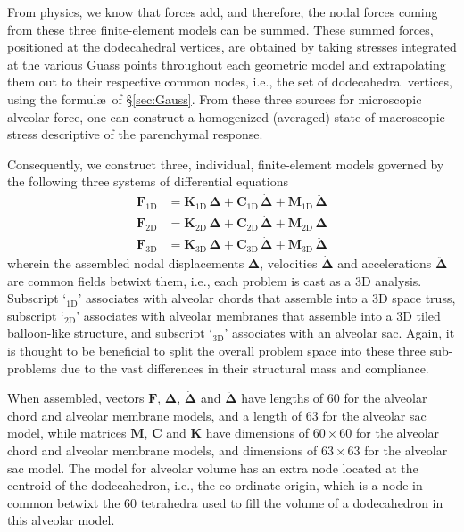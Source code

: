 From physics, we know that forces add, and therefore, the nodal forces coming from these three finite-element models can be summed.  These summed forces, positioned at the dodecahedral vertices, are obtained by taking stresses integrated at the various Guass points throughout each geometric model and extrapolating them out to their respective common nodes, i.e., the set of dodecahedral vertices, using the formul\ae\ of \S\ref{sec:Gauss}.  From these three sources for micro\-scopic alveolar force, one can construct a homo\-genized (averaged) state of macro\-scopic stress descriptive of the parenchymal response.

Consequently, we construct three, individual, finite-element models governed by the following three systems of differential equations
\begin{subequations}
    \label{EofMotion}
	\begin{align}
    \boldsymbol{F}_{\mathrm{1D}} & =
    \mathbf{K}_{\mathrm{1D}} \, \boldsymbol{\Delta} +
    \mathbf{C}_{\mathrm{1D}} \, \dot{\boldsymbol{\Delta}} +
    \mathbf{M}_{\mathrm{1D}} \, \ddot{\boldsymbol{\Delta}} \\
    \boldsymbol{F}_{\mathrm{2D}} & =
    \mathbf{K}_{\mathrm{2D}} \, \boldsymbol{\Delta} +
    \mathbf{C}_{\mathrm{2D}} \, \dot{\boldsymbol{\Delta}} + 
    \mathbf{M}_{\mathrm{2D}} \, \ddot{\boldsymbol{\Delta}} \\
    \boldsymbol{F}_{\mathrm{3D}} & = 
    \mathbf{K}_{\mathrm{3D}} \, \boldsymbol{\Delta} +
    \mathbf{C}_{\mathrm{3D}} \, \dot{\boldsymbol{\Delta}} + 
    \mathbf{M}_{\mathrm{3D}} \, \ddot{\boldsymbol{\Delta}}
	\end{align}
\end{subequations}
wherein the assembled nodal displacements $\boldsymbol{\Delta}$, velocities $\dot{\boldsymbol{\Delta}}$ and accelerations $\ddot{\boldsymbol{\Delta}}$ are common fields betwixt them, i.e., each problem is cast as a 3D analysis.  Subscript `$\mbox{}_{\mathrm{1D}}$' associates with alveolar chords that assemble into a 3D space truss, subscript `$\mbox{}_{\mathrm{2D}}$' associates with alveolar membranes that assemble into a 3D tiled balloon-like structure, and subscript `$\mbox{}_{\mathrm{3D}}$' associates with an alveolar sac.  Again, it is thought to be beneficial to split the overall problem space into these three sub-problems due to the vast differences in their structural mass and compliance.

When assembled, vectors $\boldsymbol{F}$, $\boldsymbol{\Delta}$, $\dot{\boldsymbol{\Delta}}$ and $\ddot{\boldsymbol{\Delta}}$ have lengths of 60 for the alveolar chord and alveolar membrane models, and a length of 63 for the alveolar sac model, while matrices $\mathbf{M}$, $\mathbf{C}$ and $\mathbf{K}$ have dimensions of $60 \! \times \! 60$ for the alveolar chord and alveolar membrane models, and dimensions of $63 \! \times \! 63$ for the alveolar sac model.  The model for alveolar volume has an extra node located at the centroid of the dodecahedron, i.e., the co-ordinate origin, which is a node in common betwixt the 60 tetrahedra used to fill the volume of a dodecahedron in this alveolar model. 

